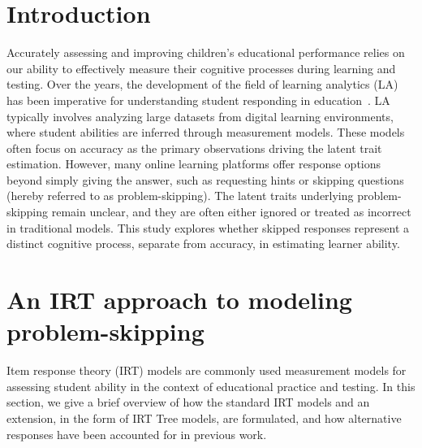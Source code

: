 \documentclass{edm_article}
\begin{document}
\section{Introduction}
Accurately assessing and improving children's educational performance relies on our ability to effectively measure their cognitive processes during learning and testing. Over the years, the development of the field of learning analytics (LA) has been imperative for understanding student responding in education~\cite{ye2022history}. LA typically involves analyzing large datasets from digital learning environments, where student abilities are inferred through measurement models. These models often focus on accuracy as the primary observations driving the latent trait estimation. However, many online learning platforms offer response options beyond simply giving the answer, such as requesting hints or skipping questions (hereby referred to as problem-skipping). The latent traits underlying problem-skipping remain unclear, and they are often either ignored or treated as incorrect in traditional models. This study explores whether skipped responses represent a distinct cognitive process, separate from accuracy, in estimating learner ability.



\section{An IRT approach to modeling problem-skipping}
Item response theory (IRT) models are commonly used measurement models for assessing student ability in the context of educational practice and testing. In this section, we give a brief overview of how the standard IRT models and an extension, in the form of IRT Tree models,  are formulated, and how alternative responses have been accounted for in previous work. 
\end{document}
